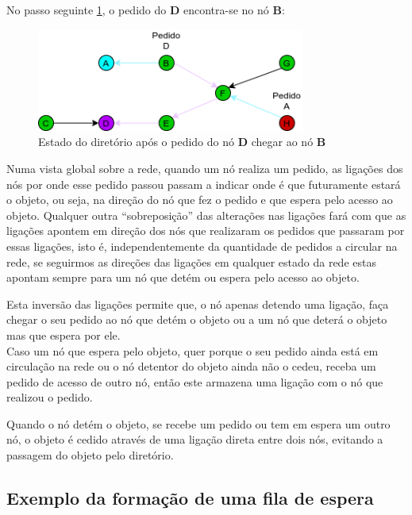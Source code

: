 No passo seguinte \ref{motivacao:img:d_chega_b}, o pedido do \textbf{D} encontra-se no nó \textbf{B}:


\begin{figure}[!htb]
\centering
\includegraphics[width=250pt]{dois_pedidos_3.png}
\caption{Estado do diretório após o pedido do nó \textbf{D} chegar ao nó \textbf{B}}
\label{motivacao:img:d_chega_b}
\end{figure}


Numa vista global sobre a rede, quando um nó realiza um pedido, as ligações dos nós por onde esse pedido passou passam a indicar onde é que futuramente estará o objeto, ou seja, na direção do nó que fez o pedido e que espera pelo acesso ao objeto.
Qualquer outra ``sobreposição'' das alterações nas ligações fará com que as ligações apontem em direção dos nós que realizaram os pedidos que passaram por essas ligações, isto é, independentemente da quantidade de pedidos a circular na rede, se seguirmos as direções das ligações em qualquer estado da rede estas apontam sempre para um nó que detém ou espera pelo acesso ao objeto.

Esta inversão das ligações permite que, o nó apenas detendo uma ligação, faça chegar o seu pedido ao nó que detém o objeto ou a um nó que deterá o objeto mas que espera por ele. \\




Caso um nó que espera pelo objeto, quer porque o seu pedido ainda está em circulação na rede ou o nó detentor do objeto ainda não o cedeu, receba um pedido de acesso de outro nó, então este armazena uma ligação com o nó que realizou o pedido.

Quando o nó detém o objeto, se recebe um pedido ou tem em espera um outro nó, o objeto é cedido através de uma ligação direta entre dois nós, evitando a passagem do objeto pelo diretório.


\subsection*{Exemplo da formação de uma fila de espera}

